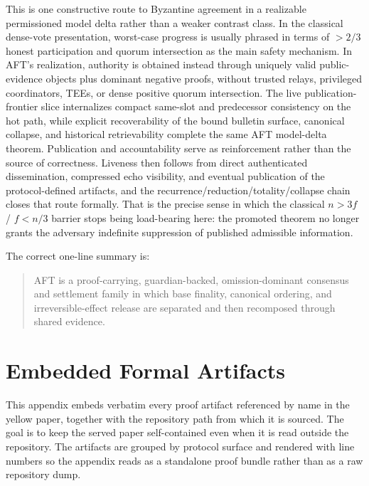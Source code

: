 \documentclass[11pt]{article}
\newcommand{\AFT}{\textsc{AFT}}
\begin{document}
This is one constructive route to Byzantine agreement in a realizable
permissioned model delta rather than a weaker contrast class. In the classical
dense-vote presentation, worst-case progress is usually phrased in terms of
\(> 2/3\) honest participation and quorum intersection as the main safety
mechanism. In \AFT{}'s realization, authority is obtained instead through
uniquely valid public-evidence objects plus dominant negative proofs, without
trusted relays, privileged coordinators, TEEs, or dense positive quorum
intersection. The live publication-frontier slice internalizes compact
same-slot and predecessor consistency on the hot path, while explicit
recoverability of the bound bulletin surface, canonical collapse, and
historical retrievability complete the same AFT model-delta theorem.
Publication and accountability serve as reinforcement rather than the source
of correctness. Liveness then follows from direct authenticated dissemination,
compressed echo visibility, and eventual publication of the protocol-defined
artifacts, and the recurrence/reduction/totality/collapse chain closes that
route formally. That is the precise sense in which the classical \(n > 3f\) /
\(f < n/3\) barrier stops being load-bearing here: the promoted theorem no
longer grants the adversary indefinite suppression of published admissible
information.

The correct one-line summary is:

\begin{quote}
\AFT{} is a proof-carrying, guardian-backed, omission-dominant consensus and
settlement family in which base finality, canonical ordering, and
irreversible-effect release are separated and then recomposed through shared
evidence.
\end{quote}

\appendix

\section{Embedded Formal Artifacts}
\label{appendix:formal-artifacts}

This appendix embeds verbatim every proof artifact referenced by name in the
yellow paper, together with the repository path from which it is sourced. The
goal is to keep the served paper self-contained even when it is read outside
the repository. The artifacts are grouped by protocol surface and rendered
with line numbers so the appendix reads as a standalone proof bundle rather
than as a raw repository dump.
\end{document}
